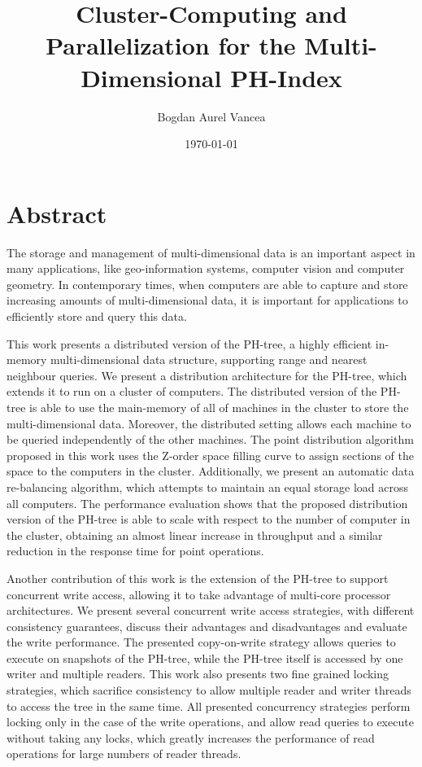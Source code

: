 \documentclass[11pt,a4paper]{globis-book}
\title{Cluster-Computing and Parallelization for the
    Multi-Dimensional PH-Index}
\author{Bogdan Aurel Vancea}
\institute{Institute of Information Systems}
\date{\today}
\begin{document}
\frontmatter
\maketitlepage
\cleardoublepage
{}

\chapter*{Abstract}

The storage and management of multi-dimensional data is an important aspect in many applications, like geo-information systems, computer vision and computer geometry. In contemporary times, when computers are able to capture and store increasing amounts of multi-dimensional data, it is important for applications to efficiently store and query this data. 

This work presents a distributed version of the PH-tree, a highly efficient in-memory multi-dimensional data structure, supporting range and nearest neighbour queries. We present a distribution architecture for the PH-tree, which extends it to run on a cluster of computers. The distributed version of the PH-tree is able to use the main-memory of all of machines in the cluster to store the multi-dimensional data. Moreover, the distributed setting allows each machine to be queried independently of the other machines. The point distribution algorithm proposed in this work uses the Z-order space filling curve to assign sections of the space to the computers in the cluster. Additionally, we present an automatic data re-balancing algorithm, which attempts to maintain an equal storage load across all computers. The performance evaluation shows that the proposed distribution version of the PH-tree is able to scale with respect to the number of computer in the cluster, obtaining an almost linear increase in throughput and a similar reduction in the response time for point operations. 

Another contribution of this work is the extension of the PH-tree to support concurrent write access, allowing it to take advantage of multi-core processor architectures. We present several concurrent write access strategies, with different consistency guarantees, discuss their advantages and disadvantages and evaluate the write performance. The presented copy-on-write strategy allows queries to execute on snapshots of the PH-tree, while the PH-tree itself is accessed by one writer and multiple readers. This work also presents two fine grained locking strategies, which sacrifice consistency to allow multiple reader and writer threads to access the tree in the same time. All presented concurrency strategies perform locking only in the case of the write operations, and allow read queries to execute without taking any locks, which greatly increases the performance of read operations for large numbers of reader threads.  
\end{document}
